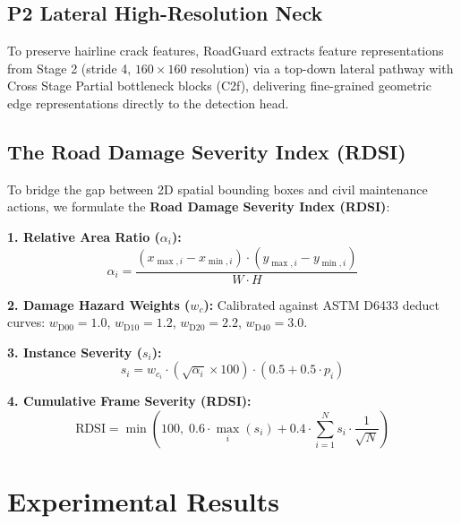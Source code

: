 \documentclass[journal,10pt]{IEEEtran}
\begin{document}
\subsection{P2 Lateral High-Resolution Neck}
To preserve hairline crack features, RoadGuard extracts feature representations from Stage 2 (stride 4, $160 \times 160$ resolution) via a top-down lateral pathway with Cross Stage Partial bottleneck blocks (C2f), delivering fine-grained geometric edge representations directly to the detection head.

\subsection{The Road Damage Severity Index (RDSI)}
To bridge the gap between 2D spatial bounding boxes and civil maintenance actions, we formulate the \textbf{Road Damage Severity Index (RDSI)}:

\textbf{1. Relative Area Ratio ($\alpha_i$):}
\begin{equation}
\alpha_i = \frac{(x_{\max, i} - x_{\min, i}) \cdot (y_{\max, i} - y_{\min, i})}{W \cdot H}
\end{equation}

\textbf{2. Damage Hazard Weights ($w_c$):} Calibrated against ASTM D6433 deduct curves: $w_{\text{D00}} = 1.0$, $w_{\text{D10}} = 1.2$, $w_{\text{D20}} = 2.2$, $w_{\text{D40}} = 3.0$.

\textbf{3. Instance Severity ($s_i$):}
\begin{equation}
s_i = w_{c_i} \cdot \left( \sqrt{\alpha_i} \times 100 \right) \cdot \left(0.5 + 0.5 \cdot p_i\right)
\end{equation}

\textbf{4. Cumulative Frame Severity (RDSI):}
\begin{equation}
\text{RDSI} = \min\left(100, \; 0.6 \cdot \max_{i}(s_i) + 0.4 \cdot \sum_{i=1}^N s_i \cdot \frac{1}{\sqrt{N}}\right)
\end{equation}

\section{Experimental Results}
\end{document}
